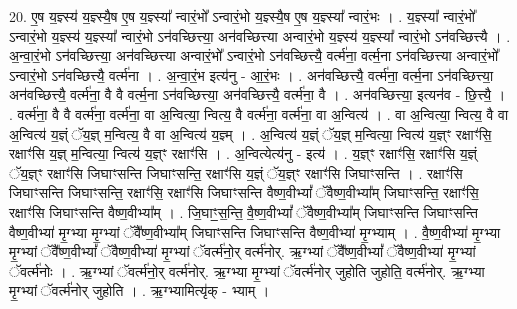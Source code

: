 \documentclass[17pt]{extarticle}
\begin{document}
20. ए॒ष य॒ज्ञ्स्य॑ य॒ज्ञ्स्यै॒ष ए॒ष य॒ज्ञ्स्या᳚ न्वारं॒भो᳚ ऽन्वारं॒भो य॒ज्ञ्स्यै॒ष ए॒ष य॒ज्ञ्स्या᳚ न्वारं॒भः । . य॒ज्ञ्स्या᳚ न्वारं॒भो᳚ ऽन्वारं॒भो य॒ज्ञ्स्य॑ य॒ज्ञ्स्या᳚ न्वारं॒भो ऽन॑वच्छित्त्या॒ अन॑वच्छित्त्या अन्वारं॒भो य॒ज्ञ्स्य॑ य॒ज्ञ्स्या᳚ न्वारं॒भो ऽन॑वच्छित्त्यै । . अ॒न्वा॒रं॒भो ऽन॑वच्छित्त्या॒ अन॑वच्छित्त्या अन्वारं॒भो᳚ ऽन्वारं॒भो ऽन॑वच्छित्त्यै॒ वर्त्म॑ना॒ वर्त्म॒ना ऽन॑वच्छित्त्या अन्वारं॒भो᳚ ऽन्वारं॒भो ऽन॑वच्छित्त्यै॒ वर्त्म॑ना । . अ॒न्वा॒रं॒भ इत्य॑नु - आ॒रं॒भः । . अन॑वच्छित्त्यै॒ वर्त्म॑ना॒ वर्त्म॒ना ऽन॑वच्छित्त्या॒ अन॑वच्छित्त्यै॒ वर्त्म॑ना॒ वै वै वर्त्म॒ना ऽन॑वच्छित्त्या॒ अन॑वच्छित्त्यै॒ वर्त्म॑ना॒ वै । . अन॑वच्छित्त्या॒ इत्यन॑व - छि॒त्त्यै॒ । . वर्त्म॑ना॒ वै वै वर्त्म॑ना॒ वर्त्म॑ना॒ वा अ॒न्वित्या॒ न्वित्य॒ वै वर्त्म॑ना॒ वर्त्म॑ना॒ वा अ॒न्वित्य॑ । . वा अ॒न्वित्या॒ न्वित्य॒ वै वा अ॒न्वित्य॑ य॒ज्ञ्ं ॅय॒ज्ञ् म॒न्वित्य॒ वै वा अ॒न्वित्य॑ य॒ज्ञ्म् । . अ॒न्वित्य॑ य॒ज्ञ्ं ॅय॒ज्ञ् म॒न्वित्या॒ न्वित्य॑ य॒ज्ञ्ꣳ रक्षाꣳ॑सि॒ रक्षाꣳ॑सि य॒ज्ञ् म॒न्वित्या॒ न्वित्य॑ य॒ज्ञ्ꣳ रक्षाꣳ॑सि । . अ॒न्वित्येत्य॑नु - इत्य॑ । . य॒ज्ञ्ꣳ रक्षाꣳ॑सि॒ रक्षाꣳ॑सि य॒ज्ञ्ं ॅय॒ज्ञ्ꣳ रक्षाꣳ॑सि जिघाꣳसन्ति जिघाꣳसन्ति॒ रक्षाꣳ॑सि य॒ज्ञ्ं ॅय॒ज्ञ्ꣳ रक्षाꣳ॑सि जिघाꣳसन्ति । . रक्षाꣳ॑सि जिघाꣳसन्ति जिघाꣳसन्ति॒ रक्षाꣳ॑सि॒ रक्षाꣳ॑सि जिघाꣳसन्ति वैष्ण॒वीभ्यां᳚ ॅवैष्ण॒वीभ्या᳚म् जिघाꣳसन्ति॒ रक्षाꣳ॑सि॒ रक्षाꣳ॑सि जिघाꣳसन्ति वैष्ण॒वीभ्या᳚म् । . जि॒घाꣳ॒॒स॒न्ति॒ वै॒ष्ण॒वीभ्यां᳚ ॅवैष्ण॒वीभ्या᳚म् जिघाꣳसन्ति जिघाꣳसन्ति वैष्ण॒वीभ्या॑ मृ॒ग्भ्या मृ॒ग्भ्यां ॅवै᳚ष्ण॒वीभ्या᳚म् जिघाꣳसन्ति जिघाꣳसन्ति वैष्ण॒वीभ्या॑ मृ॒ग्भ्याम् । . वै॒ष्ण॒वीभ्या॑ मृ॒ग्भ्या मृ॒ग्भ्यां ॅवै᳚ष्ण॒वीभ्यां᳚ ॅवैष्ण॒वीभ्या॑ मृ॒ग्भ्यां ॅवर्त्म॑नो॒र् वर्त्म॑नोर्. ऋ॒ग्भ्यां ॅवै᳚ष्ण॒वीभ्यां᳚ ॅवैष्ण॒वीभ्या॑ मृ॒ग्भ्यां ॅवर्त्म॑नोः । . ऋ॒ग्भ्यां ॅवर्त्म॑नो॒र् वर्त्म॑नोर्. ऋ॒ग्भ्या मृ॒ग्भ्यां ॅवर्त्म॑नोर् जुहोति जुहोति॒ वर्त्म॑नोर्. ऋ॒ग्भ्या मृ॒ग्भ्यां ॅवर्त्म॑नोर् जुहोति । . ऋ॒ग्भ्यामित्यृ॑क् - भ्याम् । \newline
\end{document}
